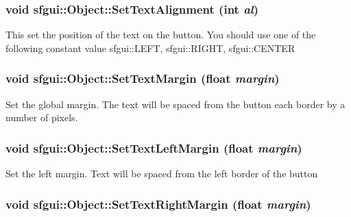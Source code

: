 \hypertarget{classsfgui_1_1Object_191bba44abbc751fd80e6f19ad6aba5b}{
\subsubsection[SetTextAlignment]{\setlength{\rightskip}{0pt plus 5cm}void sfgui::Object::SetTextAlignment (int {\em al})}}
\label{classsfgui_1_1Object_191bba44abbc751fd80e6f19ad6aba5b}




This set the position of the text on the button. You should use one of the following constant value sfgui::LEFT, sfgui::RIGHT, sfgui::CENTER \hypertarget{classsfgui_1_1Object_f71c39eb2dfd2eb76e9be9e5dad606d9}{
\subsubsection[SetTextMargin]{\setlength{\rightskip}{0pt plus 5cm}void sfgui::Object::SetTextMargin (float {\em margin})}}
\label{classsfgui_1_1Object_f71c39eb2dfd2eb76e9be9e5dad606d9}




Set the global margin. The text will be spaced from the button each border by a number of pixels. \hypertarget{classsfgui_1_1Object_28408aa0cf50c8da37a79215755c01d9}{
\subsubsection[SetTextLeftMargin]{\setlength{\rightskip}{0pt plus 5cm}void sfgui::Object::SetTextLeftMargin (float {\em margin})}}
\label{classsfgui_1_1Object_28408aa0cf50c8da37a79215755c01d9}




Set the left margin. Text will be spaced from the left border of the button \hypertarget{classsfgui_1_1Object_dcea61673771a680fc47e4b838c2a59e}{
\subsubsection[SetTextRightMargin]{\setlength{\rightskip}{0pt plus 5cm}void sfgui::Object::SetTextRightMargin (float {\em margin})}}
\label{classsfgui_1_1Object_dcea61673771a680fc47e4b838c2a59e}




